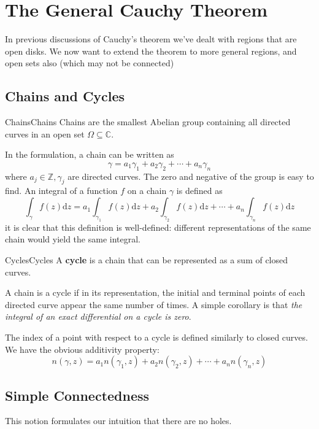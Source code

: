 \documentclass[../main.tex]{subfiles}
\begin{document}
\section{The General Cauchy Theorem}
In previous discussions of Cauchy's theorem we've dealt with regions that are open disks. We now want to extend the theorem to more general regions, and open sets also (which may not be connected)

\subsection{Chains and Cycles}
\begin{definition}{Chains}{Chains}
	Chains are the smallest Abelian group containing all directed curves in an open set $\Omega \subseteq \mathbb{C}$.
\end{definition}
In the formulation, a chain can be written as
\begin{equation}
\gamma = a_1\gamma_1 + a_2\gamma_2 + \cdots + a_n\gamma_n
\end{equation}
where $a_j\in \mathbb{Z},\gamma_j$ are directed curves. The zero and negative of the group is easy to find. An integral of a function $f$ on a chain $\gamma$ is defined as
\begin{equation}
	\int_{\gamma} f(z) \mathrm{d} z = a_1 \int_{\gamma_1} f(z) \mathrm{d} z + a_2 \int_{\gamma_2} f(z) \mathrm{d} z + \cdots + a_n \int_{\gamma_n} f(z) \mathrm{d} z
\end{equation}
it is clear that this definition is well-defined: different representations of the same chain would yield the same integral.

\begin{definition}{Cycles}{Cycles}
	A \textbf{cycle} is a chain that can be represented as a sum of closed curves.
\end{definition}
A chain is a cycle if in its representation, the initial and terminal points of each directed curve appear the same number of times. A simple corollary is that \emph{the integral of an exact differential on a cycle is zero}.

The index of a point with respect to a cycle is defined similarly to closed curves. We have the obvious additivity property:
\begin{equation}
	n(\gamma,z) = a_1 n(\gamma_1,z) + a_2 n(\gamma_2,z) + \cdots + a_n n(\gamma_n,z)
\end{equation}

\subsection{Simple Connectedness}
This notion formulates our intuition that there are no holes.
\end{document}
